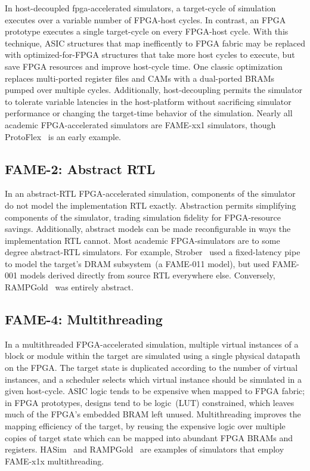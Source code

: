 In host-decoupled fpga-accelerated simulators, a target-cycle of simulation
executes over a variable number of FPGA-host cycles. In contrast, an
FPGA prototype executes a single target-cycle on every FPGA-host cycle. With
this technique, ASIC structures that map inefficently to FPGA fabric may be replaced
with optimized-for-FPGA structures that take more host cycles to execute, but save
FPGA resources and improve host-cycle time.  One classic optimization replaces
multi-ported register files and CAMs with a dual-ported BRAMs pumped over
multiple cycles.  Additionally, host-decoupling permits the simulator to
tolerate variable latencies in the host-platform without sacrificing simulator
performance or changing the target-time behavior of the simulation. Nearly all
academic FPGA-accelerated simulators are FAME-xx1 simulators, though
ProtoFlex~\cite{ProtoFlex} is an early example.

\subsection{FAME-2: Abstract RTL}

In an abstract-RTL FPGA-accelerated simulation, components of the simulator do
not model the implementation RTL exactly. Abstraction permits simplifying
components of the simulator, trading simulation fidelity for FPGA-resource
savings. Additionally, abstract models can be made reconfigurable in ways the
implementation RTL cannot. Most academic FPGA-simulators are to some degree
abstract-RTL simulators.  For example, Strober~\cite{strober} used a
fixed-latency pipe to model the target's DRAM subsystem~(a FAME-011 model),
but used FAME-001 models derived directly from source RTL everywhere else.
Conversely, RAMPGold~\cite{RAMPGold} was entirely abstract.

\subsection{FAME-4: Multithreading}

In a multithreaded FPGA-accelerated simulation, multiple virtual instances of a
block or module within the target are simulated using a single physical
datapath on the FPGA. The target state is duplicated according to the number of
virtual instances, and a scheduler selects which virtual instance should be
simulated in a given host-cycle. ASIC logic tends to be expensive when mapped
to FPGA fabric; in FPGA prototypes, designs tend to be logic~(LUT) constrained,
which leaves much of the FPGA's embedded BRAM left unused.  Multithreading
improves the mapping efficiency of the target, by reusing the expensive logic
over multiple copies of target state which can be mapped into abundant FPGA BRAMs and registers.
HASim~\cite{HASim} and RAMPGold~\cite{RampGold} are examples of simulators that
employ FAME-x1x multithreading.


